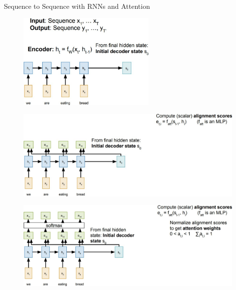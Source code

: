 \begin{frame}[allowframebreaks]{Sequence to Sequence with RNNs and Attention}
    \begin{figure}
        \flushleft
        \includegraphics[width=0.6\textwidth,keepaspectratio]{images/rnn/slide_15_1_img.jpg}
    \end{figure}

    \framebreak

    \begin{figure}
        \centering
        \includegraphics[width=1\textwidth,keepaspectratio]{images/rnn/slide_16_1_img.jpg}
    \end{figure}

    \framebreak

    \begin{figure}
        \centering
        \includegraphics[width=1\textwidth,keepaspectratio]{images/rnn/slide_17_1_img.jpg}
    \end{figure}


\end{frame}
